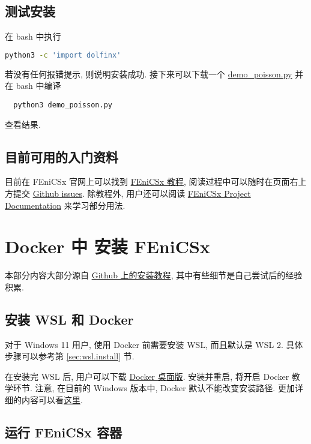 \documentclass[fontset=founder]{ctexrep}
\begin{document}
\section{测试安装}

在 \textsf{bash} 中执行
\begin{lstlisting}[language = bash]
  python3 -c 'import dolfinx'
\end{lstlisting}
若没有任何报错提示,
则说明安装成功.
接下来可以下载一个
\href{https://docs.fenicsproject.org/dolfinx/main/python/_downloads/b94ac7be61dc3726ca331afd20f195d2/demo_poisson.py}{demo\_poisson.py}
并在 \textsf{bash} 中编译
\begin{lstlisting}
  python3 demo_poisson.py
\end{lstlisting}
查看结果.

\section{目前可用的入门资料}

目前在 FEniCSx 官网上可以找到
\href{https://jsdokken.com/dolfinx-tutorial/}{FEniCSx 教程},
阅读过程中可以随时在页面右上方提交 \href{https://github.com/jorgensd/dolfinx-tutorial/issues/new?title=Issue%20on%20page%20%2Findex.html&body=Your%20issue%20content%20here.}{Github issues}.
除教程外,
用户还可以阅读
\href{https://docs.fenicsproject.org/}{FEniCSx Project Documentation}
来学习部分用法.

\chapter{Docker 中 安装 FEniCSx}

本部分内容大部分源自 \href{https://github.com/FEniCS/dolfinx#docker-images}{Github 上的安装教程},
其中有些细节是自己尝试后的经验积累.

\section{安装 WSL 和 Docker}

对于 Windows 11 用户,
使用 Docker 前需要安装 WSL,
而且默认是 WSL 2.
具体步骤可以参考第 \ref{sec:wsl.install} 节.

在安装完 WSL 后,
用户可以下载 \href{https://www.docker.com/get-started}{Docker 桌面版}.
安装并重启,
将开启 Docker 教学环节.
注意,
在目前的 Windows 版本中,
Docker 默认不能改变安装路径.
更加详细的内容可以看\href{https://docs.docker.com/desktop/windows/install/}{这里}.

\section{运行 FEniCSx 容器}
\end{document}
